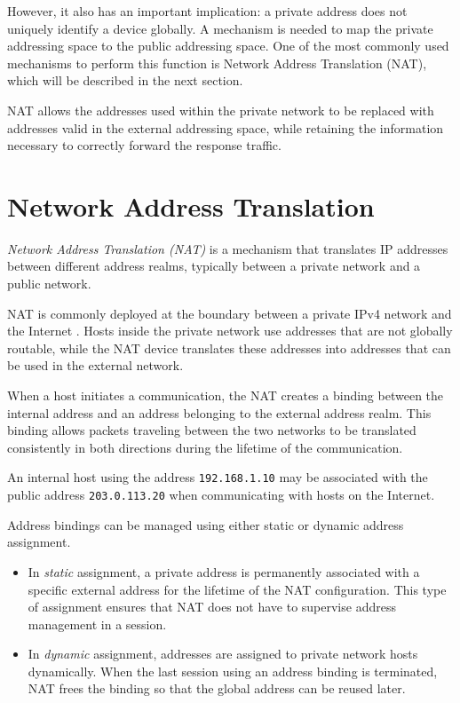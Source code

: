 However, it also has an important implication: a private address does not uniquely identify a device globally. A mechanism is needed to map the private addressing space to the public addressing space. One of the most commonly used mechanisms to perform this function is Network Address Translation (NAT), which will be described in the next section.

NAT allows the addresses used within the private network to be replaced with addresses valid in the external addressing space, while retaining the information necessary to correctly forward the response traffic.

\newpage
\section{Network Address Translation}
\begin{definition}
	\textit{Network Address Translation (NAT)} is a mechanism
	that translates IP addresses between different address realms,
	typically between a private network and a public network.
\end{definition}

NAT is commonly deployed at the boundary between a private IPv4 network and the Internet \cite{rfc2663}.
Hosts inside the private network use addresses that are not globally routable, while the NAT device translates these addresses into addresses that can be used in the external network.

When a host initiates a communication, the NAT creates a binding between the internal address and an address belonging to the external address realm. This binding allows packets traveling between the two networks to be translated consistently in both directions during the lifetime of the communication.

\begin{example}
	An internal host using the address \texttt{192.168.1.10} may be associated with the public address \texttt{203.0.113.20} when communicating with hosts on the Internet.
\end{example}

Address bindings can be managed using either static or dynamic address assignment.
\begin{itemize}
	\item In \textit{static} assignment, a private address is permanently associated with a specific external address for the lifetime of the NAT configuration. This type of assignment ensures that NAT does not have to supervise address management in a session.

	\item In \textit{dynamic} assignment, addresses are assigned to private network hosts dynamically. When the last session using an address binding is terminated, NAT frees the binding so that the global address can be reused later.
\end{itemize}


